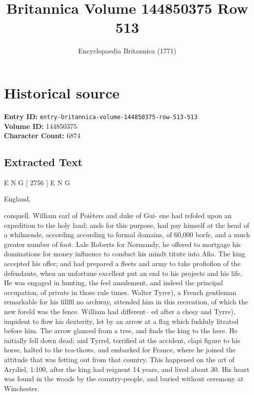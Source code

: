 \documentclass{article}
\title{Britannica Volume 144850375 Row 513}
\date{Encyclopaedia Britannica (1771)}
\begin{document}
\maketitle

\section*{Historical source}
\textbf{Entry ID:} \texttt{entry-britannica-volume-144850375-row-513-513} \\
\textbf{Volume ID:} 144850375 \\
\textbf{Character Count:} 6874

\subsection*{Extracted Text}
E N G [ 2756 ] E N G

England.

conquell. William earl of Poièters and duke of Gui- ene had refoled upon an expedition to the holy land; ands for this purpose, had pay himself at the head of a whilmende, according according to formal domains, of 60,000 borfe, and a much greater number of foot. Lale Roberts for Normandy, he offered to mortgage his dominations for money influence to conduct his mindt titute into Afia. The king accepted his offer; and had prepared a fleets and army to take profiofion of the defendants, when an unfortune excellent put an end to his projects and his life. He was engaged in hunting, the feel amulement, and indeed the principal occupation, of private in those rule times. Walter Tyrer), a French gentleman remarkable for his fillfll no archway, attended him in this recreation, of which the new foreld was the fence. William had different– ed after a chesy and Tyrre), impident to flow his dexterity, let by an arrow at a flag which fudduly litrated before him. The arrow glanced from a tree, and finds the king to the here. He initially fell down dead; and Tyrrel, terrified at the accident, clapi figure to his horse, halted to the tea-thows, and embarked for France, where he joined the attitude that was fetting out from that country. This happened on the art of Arydiel, 1:100, after the king had reignent 14 years, and lived about 30. His heart was found in the woods by the country-people, and buried without ceremony at Winchester.
\end{document}
